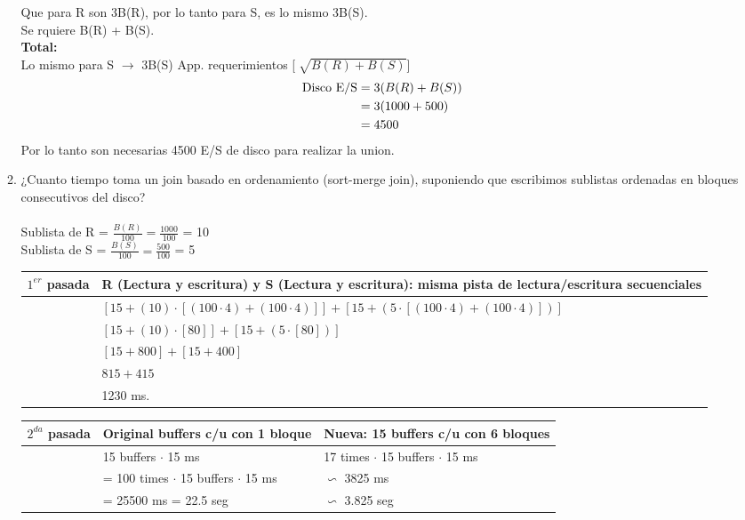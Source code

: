 \documentclass{templateNote}
\begin{document}
\begin{enumerate}
\begin{enumerate}[label=\alph*)]
        \vspace{0.5cm}
        \noindent Que para R son 3B(R), por lo tanto para S, es lo mismo 3B(S). \\Se rquiere B(R) + B(S). \\

        \textbf{Total: }\\
        Lo mismo para S $\rightarrow$ 3B(S) App. requerimientos [$\sqrt[]{{B(R)+B(S)}}$]\\
        \begin{align*}
            \textnormal{Disco E/S} &= 3(B(R)+B(S)) \\
            &= 3(1000+500) \\
            &= 4500 \\ 
        \end{align*}
        Por lo tanto son necesarias 4500 E/S de disco para realizar la union.\\

        \item ¿Cuanto tiempo toma un join basado en ordenamiento (sort-merge join), suponiendo que escribimos sublistas ordenadas en bloques consecutivos del disco? \\\\
        Sublista de R = $\frac{B(R)}{100} = \frac{1000}{100}$ = 10 \\
        Sublista de S = $\frac{B(S)}{100} = \frac{500}{100}$ = 5 \\

        \begin{tabular}{|m{2cm}|m{10cm}|}
            \hline
            $1^{er}$ pasada & R (Lectura y escritura) y S (Lectura y escritura): misma pista de lectura/escritura secuenciales \\
            \hline
            & $[15+(10)\cdot[(100\cdot4)+(100\cdot4)]]+[15+(5\cdot[(100\cdot4)+(100\cdot4)])]$ \\ 
            & $[15+(10)\cdot[80]]+[15+(5\cdot[80])]$ \\
            & $[15+800]+[15+400]$ \\
            & $815+415$ \\
            & 1230 ms. \\
            \hline
        \end{tabular}

        \begin{tabular}{|m{2cm}|m{6cm}|m{6cm}|}
            \hline
            $2^{da}$ pasada & Original \newline 15 buffers c/u con 1 bloque & Nueva: 15 buffers c/u con 6 bloques\\
            \hline
            & 15 buffers $\cdot$ 15 ms & 17 times $\cdot$ 15 buffers $\cdot$ 15 ms \\
            & = 100 times $\cdot$ 15 buffers $\cdot$ 15 ms & $\backsim$ 3825 ms \\
            & = 25500 ms = 22.5 seg & $\backsim$ 3.825 seg\\
            \hline
        \end{tabular}
        

\end{enumerate}
\end{enumerate}
\end{document}
